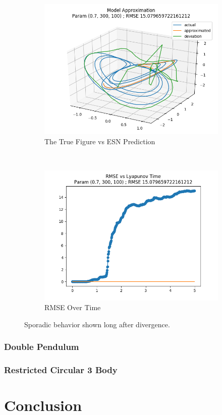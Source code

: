 \documentclass{article}
\begin{document}
\begin{figure}[H]
    \centering
    \begin{subfigure}[b]{0.45\textwidth}
        \includegraphics[width=\textwidth]{doc/paper/images/lorenz/rank_7_param_73_fit.png}
        \caption{The True Figure vs ESN Prediction}
        \label{fig:lorenz_r7_fit}
    \end{subfigure}
    ~
    \begin{subfigure}[b]{0.45\textwidth}
        \includegraphics[width=\textwidth]{doc/paper/images/lorenz/rank_7_param_73_rmse.png}
        \caption{RMSE Over Time}
        \label{fig:lorenz_r7_rmse}
    \end{subfigure}
    \caption{Sporadic behavior shown long after divergence.}
    \label{fig:lorenz_r7}
\end{figure}

\subsubsection{Double Pendulum}



\subsubsection{Restricted Circular 3 Body}

\section{Conclusion}



\end{document}
